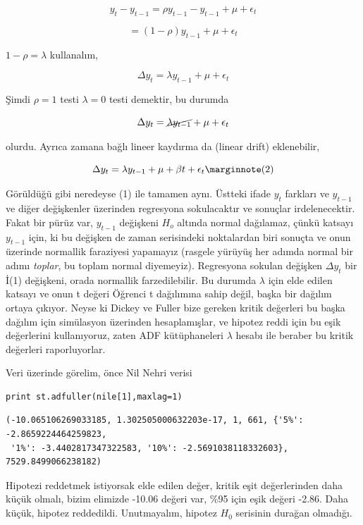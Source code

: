\documentclass[12pt,fleqn]{article}\usepackage{../../common}
\begin{document}
$$ y_t - y_{t-1} = \rho y_{t-1} - y_{t-1} + \mu + \epsilon_t $$

$$  = (1-\rho) y_{t-1} + \mu + \epsilon_t $$

$1-\rho = \lambda$ kullanalım,

$$ \Delta y_t  = \lambda y_{t-1} + \mu + \epsilon_t $$

Şimdi $\rho = 1$ testi $\lambda=0$ testi demektir, bu durumda

$$ \Delta y_t  = \cancel{\lambda y_{t-1}} + \mu + \epsilon_t $$

olurdu. Ayrıca zamana bağlı lineer kaydırma da (linear drift) eklenebilir, 

$$ \Delta y_t  = \lambda y_{t-1} + \mu + \beta t + \epsilon_t
\mlabel{2}
$$

Görüldüğü gibi neredeyse (1) ile tamamen aynı. Üstteki ifade $y_t$ farkları
ve $y_{t-1}$ ve diğer değişkenler üzerinden regresyona sokulacaktır ve
sonuçlar irdelenecektir.  Fakat bir pürüz var, $y_{t-1}$ değişkeni $H_o$
altında normal dağılamaz, çünkü katsayı $y_{t-1}$ için, ki bu değişken de
zaman serisindeki noktalardan biri sonuçta ve onun üzerinde normallik
faraziyesi yapamayız (rasgele yürüyüş her adımda normal bir adımı {\em
  toplar}, bu toplam normal diyemeyiz). Regresyona sokulan değişken
 $\Delta y_t$ bir İ(1) değişkeni, orada normallik farzedilebilir. Bu durumda
$\lambda$ için elde edilen katsayı ve onun t değeri Öğrenci t dağılımına
sahip değil, başka bir dağılım ortaya çıkıyor. Neyse ki Dickey ve Fuller
bize gereken kritik değerleri bu başka dağılım için simülasyon üzerinden
hesaplamışlar, ve hipotez reddi için bu eşik değerlerini kullanıyoruz,
zaten ADF kütüphaneleri $\lambda$ hesabı ile beraber bu kritik değerleri
raporluyorlar.

Veri üzerinde görelim, önce Nil Nehri verisi

\begin{verbatim}
print st.adfuller(nile[1],maxlag=1)
\end{verbatim}

\begin{verbatim}
(-10.065106269033185, 1.302505000632203e-17, 1, 661, {'5%': -2.8659224464259823,
 '1%': -3.4402817347322583, '10%': -2.5691038118332603}, 7529.8499066238182)
\end{verbatim}

Hipotezi reddetmek istiyorsak elde edilen değer, kritik eşit değerlerinden daha
küçük olmalı, bizim elimizde -10.06 değeri var, \%95 için eşik değeri
-2.86. Daha küçük, hipotez reddedildi. Unutmayalım, hipotez $H_0$ serisinin
durağan olmadığı. 
 
\end{document}
